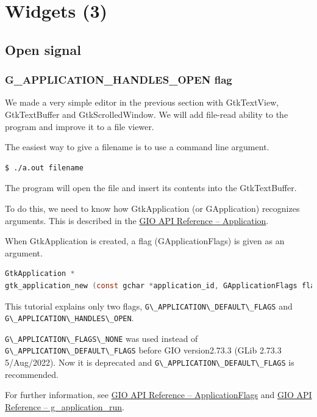 \section{Widgets (3)}\label{widgets-3}

\subsection{Open signal}\label{open-signal}

\subsubsection{G\_APPLICATION\_HANDLES\_OPEN
flag}\label{g_application_handles_open-flag}

We made a very simple editor in the previous section with GtkTextView,
GtkTextBuffer and GtkScrolledWindow. We will add file-read ability to
the program and improve it to a file viewer.

The easiest way to give a filename is to use a command line argument.

\begin{lstlisting}
$ ./a.out filename
\end{lstlisting}

The program will open the file and insert its contents into the
GtkTextBuffer.

To do this, we need to know how GtkApplication (or GApplication)
recognizes arguments. This is described in the
\href{https://docs.gtk.org/gio/class.Application.html}{GIO API Reference
-- Application}.

When GtkApplication is created, a flag (GApplicationFlags) is given as
an argument.

\begin{lstlisting}[language=C]
GtkApplication *
gtk_application_new (const gchar *application_id, GApplicationFlags flags);
\end{lstlisting}

This tutorial explains only two flags,
\passthrough{\lstinline!G\_APPLICATION\_DEFAULT\_FLAGS!} and
\passthrough{\lstinline!G\_APPLICATION\_HANDLES\_OPEN!}.

\passthrough{\lstinline!G\_APPLICATION\_FLAGS\_NONE!} was used instead
of \passthrough{\lstinline!G\_APPLICATION\_DEFAULT\_FLAGS!} before GIO
version2.73.3 (GLib 2.73.3 5/Aug/2022). Now it is deprecated and
\passthrough{\lstinline!G\_APPLICATION\_DEFAULT\_FLAGS!} is recommended.

For further information, see
\href{https://docs.gtk.org/gio/flags.ApplicationFlags.html}{GIO API
Reference -- ApplicationFlags} and
\href{https://docs.gtk.org/gio/method.Application.run.html}{GIO API
Reference -- g\_application\_run}.

